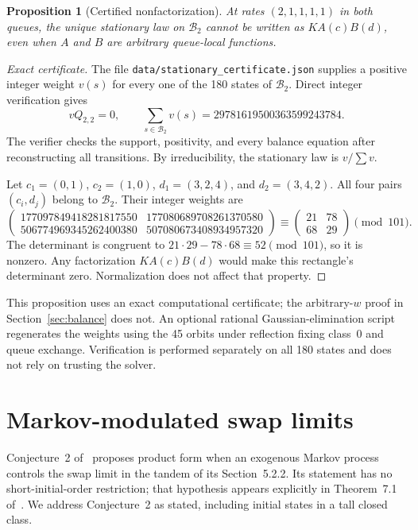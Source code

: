 \documentclass[11pt]{article}
\newtheorem{proposition}[theorem]{Proposition}
\theoremstyle{remark}
\begin{document}
\begin{proposition}[Certified nonfactorization]\label{prop:nonfactor}
At rates $(2,1,1,1,1)$ in both queues, the unique stationary law on $\mathcal B_2$ cannot be written as $KA(c)B(d)$, even when $A$ and $B$ are arbitrary queue-local functions.
\end{proposition}
\begin{proof}[Exact certificate]
The file \texttt{data/stationary\_certificate.json} supplies a positive integer weight $v(s)$ for every one of the 180 states of $\mathcal B_2$. Direct integer verification gives
\[
 vQ_{2,2}=0,\qquad
 \sum_{s\in\mathcal B_2}v(s)=29781619500363599243784.
\]
The verifier checks the support, positivity, and every balance equation after reconstructing all transitions. By irreducibility, the stationary law is $v/\sum v$.

Let $c_1=(0,1)$, $c_2=(1,0)$, $d_1=(3,2,4)$, and $d_2=(3,4,2)$. All four pairs $(c_i,d_j)$ belong to $\mathcal B_2$. Their integer weights are
\[
 \begin{pmatrix}
 177097849418281817550&177080689708261370580\\
 506774969345262400380&507080673408934957320
 \end{pmatrix}
 \equiv
 \begin{pmatrix}21&78\\68&29\end{pmatrix}\pmod{101}.
\]
The determinant is congruent to $21\cdot29-78\cdot68\equiv52\pmod{101}$, so it is nonzero. Any factorization $KA(c)B(d)$ would make this rectangle's determinant zero. Normalization does not affect that property.
\end{proof}

This proposition uses an exact computational certificate; the arbitrary-$w$ proof in Section~\ref{sec:balance} does not. An optional rational Gaussian-elimination script regenerates the weights using the 45 orbits under reflection fixing class~0 and queue exchange. Verification is performed separately on all 180 states and does not rely on trusting the solver.


\section{Markov-modulated swap limits}\label{sec:modulated}
Conjecture~2 of~\cite[p.~245]{DG} proposes product form when an exogenous Markov process controls the swap limit in the tandem of its Section~5.2.2. Its statement has no short-initial-order restriction; that hypothesis appears explicitly in Theorem~7.1 of~\cite[p.~240]{DG}. We address Conjecture~2 as stated, including initial states in a tall closed class.
\end{document}
